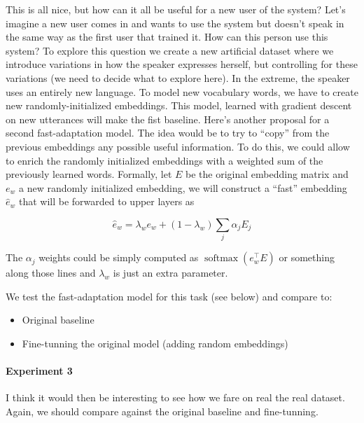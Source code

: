 \documentclass[11pt,a4paper]{article}
\begin{document}
This is all nice, but how can it all be useful for a new user of the system? 
Let's imagine a new user comes in and wants to use the system but doesn't speak 
in the same way as the first user that trained it. How can this person use this 
system? To explore this question we create a new artificial dataset where we 
introduce variations in how the speaker expresses herself, but controlling for 
these variations (we need to decide what to explore here). In the extreme, the 
speaker uses an entirely new language. To model new vocabulary words, we have 
to create new randomly-initialized embeddings. This model, learned with 
gradient descent on new utterances will make the fist baseline. Here's another 
proposal for a second fast-adaptation model. The idea would be to try to 
``copy'' from the previous embeddings any possible useful information. To do 
this, we could allow to enrich the randomly initialized embeddings with a 
weighted sum of the previously learned words. Formally, let 
$E$ be the original embedding matrix and $e_w$ a new randomly initialized 
embedding, we will construct a ``fast'' embedding $\hat{e}_w$ that will be 
forwarded to upper layers as 

$$\hat{e}_w = \lambda_w e_w + (1-\lambda_w) \sum_j{\alpha_j E_j}$$

The $\alpha_j$ weights could be simply computed as $\operatorname{softmax}(e_w 
^\top E)$ or something along those lines and $\lambda_w$ is just an extra 
parameter.

 We test the fast-adaptation model for this task (see below) and compare to:
\begin{itemize}
	\item Original baseline
	\item Fine-tunning the original model (adding random embeddings)
\end{itemize}

\paragraph{Experiment 3}

I think it would then be interesting to see how we fare on real the real 
dataset. Again, we should compare against the original baseline and 
fine-tunning.


%
%
%
%
%
\end{document}
